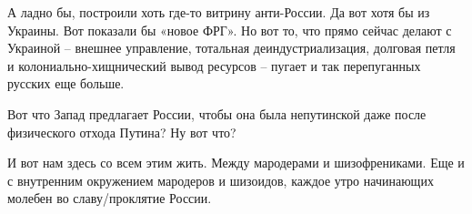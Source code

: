 А ладно бы, построили хоть где-то витрину анти-России. Да вот хотя бы из
Украины. Вот показали бы «новое ФРГ». Но вот то, что прямо сейчас делают с
Украиной – внешнее управление, тотальная деиндустриализация, долговая петля и
колониально-хищнический вывод ресурсов – пугает и так перепуганных русских еще
больше.

Вот что Запад предлагает России, чтобы она была непутинской даже после
физического отхода Путина? Ну вот что?

И вот нам здесь со всем этим жить. Между мародерами и шизофрениками. Еще и с
внутренним окружением мародеров и шизоидов, каждое утро начинающих молебен во
славу/проклятие России.

